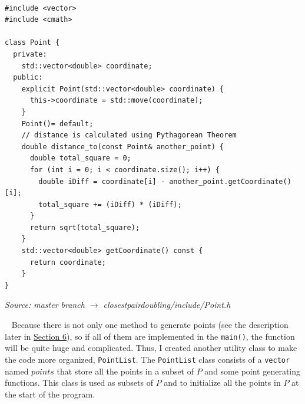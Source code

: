 \documentclass[12pt,english,]{article}
\newcommand{\code}[1]{\colorbox{light-gray}{\texttt{#1}}}
\begin{document}
~

\begin{lstlisting}
#include <vector>
#include <cmath>

class Point {
  private:
    std::vector<double> coordinate;
  public:
    explicit Point(std::vector<double> coordinate) {
      this->coordinate = std::move(coordinate);
    }
    Point()= default;
    // distance is calculated using Pythagorean Theorem
    double distance_to(const Point& another_point) {
      double total_square = 0;
      for (int i = 0; i < coordinate.size(); i++) {
        double iDiff = coordinate[i] - another_point.getCoordinate()[i];
        total_square += (iDiff) * (iDiff);
      }
      return sqrt(total_square);
    }
    std::vector<double> getCoordinate() const {
      return coordinate;
    }
}
\end{lstlisting}
\vspace{-9truemm}
\begin{minipage}{1\textwidth}
  \begin{flushright}
  {\footnotesize \emph{Source: master branch $\rightarrow$ closestpairdoubling/include/Point.h}\par}
  \end{flushright}
\end{minipage}
\vspace{0.5truemm}

~ Because there is not only one method to generate points (see the
description later in \protect\hyperlink{section6}{Section 6}), so if all
of them are implemented in the \code{main()}, the function will be quite
huge and complicated. Thus, I created another utility class to make the
code more organized, \code{PointList}. The \code{PointList} class
consists of a \code{vector} named \(points\) that store all the points
in a subset of \(P\) and some point generating functions. This class is
used as subsets of \(P\) and to initialize all the points in \(P\) at
the start of the program.

~
\end{document}
